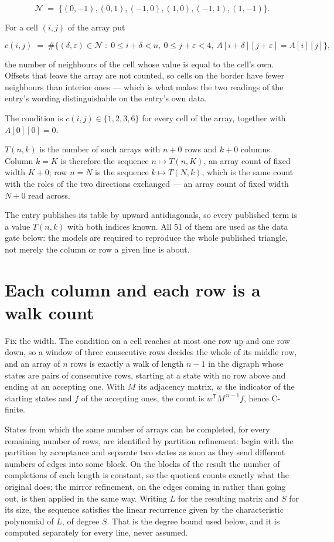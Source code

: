 \documentclass[11pt]{article}
\theoremstyle{definition}
\begin{document}
\[\mathcal{N} \;=\; \{(0,-1), (0,1), (-1,0), (1,0), (-1,1), (1,-1)\}.\]

For a cell $(i,j)$ of the array put

\[c(i,j) \;=\; \#\bigl\{(\delta,\varepsilon)\in\mathcal{N} \;:\; 0\le i+\delta<n,\ 0\le j+\varepsilon<4,\ A[i+\delta][j+\varepsilon] = A[i][j]\bigr\},\]

the number of neighbours of the cell whose value is equal to the cell's own. Offsets that leave the array are not counted, so cells on the border have fewer neighbours than interior ones --- which is what makes the two readings of the entry's wording distinguishable on the entry's own data.

The condition is $c(i,j) \in \{1, 2, 3, 6\}$ for every cell of the array, together with $A[0][0]=0$.

$T(n,k)$ is the number of such arrays with $n + 0$ rows and $k + 0$ columns. Column $k = K$ is therefore the sequence $n \mapsto T(n,K)$, an array count of fixed width $K + 0$; row $n = N$ is the sequence $k \mapsto T(N,k)$, which is the same count with the roles of the two directions exchanged --- an array count of fixed width $N + 0$ read across.

The entry publishes its table by upward antidiagonals, so every published term is a value $T(n,k)$ with both indices known. All 51 of them are used as the data gate below: the models are required to reproduce the whole published triangle, not merely the column or row a given line is about.

\section{Each column and each row is a walk count}

Fix the width. The condition on a cell reaches at most one row up and one row down, so a window of three consecutive rows decides the whole of its middle row, and an array of $n$ rows is exactly a walk of length $n-1$ in the digraph whose states are pairs of consecutive rows, starting at a state with no row above and ending at an accepting one. With $M$ its adjacency matrix, $w$ the indicator of the starting states and $f$ of the accepting ones, the count is $w^{\mathsf T}M^{\,n-1}f$, hence C-finite.

States from which the same number of arrays can be completed, for every remaining number of rows, are identified by partition refinement: begin with the partition by acceptance and separate two states as soon as they send different numbers of edges into some block. On the blocks of the result the number of completions of each length is constant, so the quotient counts exactly what the original does; the mirror refinement, on the edges coming in rather than going out, is then applied in the same way. Writing $L$ for the resulting matrix and $S$ for its size, the sequence satisfies the linear recurrence given by the characteristic polynomial of $L$, of degree $S$. That is the degree bound used below, and it is computed separately for every line, never assumed.
\end{document}
